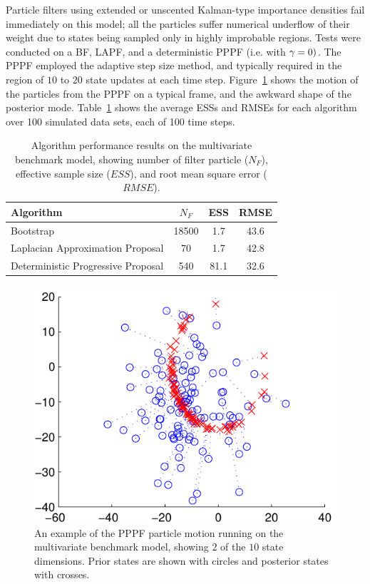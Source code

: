 \documentclass{article}
\begin{document}
Particle filters using extended or unscented Kalman-type importance densities fail immediately on this model; all the particles suffer numerical underflow of their weight due to states being sampled only in highly improbable regions. Tests were conducted on a BF, LAPF, and a deterministic PPPF (i.e. with $\gamma=0)$. The PPPF employed the adaptive step size method, and typically required in the region of $10$ to $20$ state updates at each time step. Figure~\ref{fig:nlng_example_frame} shows the motion of the particles from the PPPF on a typical frame, and the awkward shape of the posterior mode. Table~\ref{tab:nlng_results} shows the average ESSs and RMSEs for each algorithm over 100 simulated data sets, each of 100 time steps.
%
\begin{table}
\centering
\begin{tabular}{l||c|c|c}
Algorithm                                & $N_F$ & ESS  & RMSE \\
\hline
Bootstrap                                & 18500 &  1.7 & 43.6 \\
Laplacian Approximation Proposal         &    70 &  1.7 & 42.8 \\
Deterministic Progressive Proposal       &   540 & 81.1 & 32.6 \\
\end{tabular}
\caption{Algorithm performance results on the multivariate benchmark model, showing number of filter particle ($N_F$), effective sample size ($ESS$), and root mean square error ($RMSE$).}
\label{tab:nlng_results}
\end{table}
%
\begin{figure}
\centering
\includegraphics[width=0.7\columnwidth]{nlng_example_frame_deter.pdf}
\caption{An example of the PPPF particle motion running on the multivariate benchmark model, showing $2$ of the $10$ state dimensions. Prior states are shown with circles and posterior states with crosses.}
\label{fig:nlng_example_frame}
\end{figure}
\end{document}
